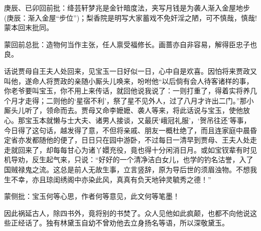 
\begin{parag}

    \begin{note}庚辰、已卯回前批：绛芸轩梦兆是金针暗度法，夹写月钱是为袭人渐入金屋地步(庚辰：渐入金屋“步位”)；梨香院是明写大家蓄戏不免奸淫之陋，可不慎哉，慎哉!蒙本回末批同。\end{note}
\end{parag}


\begin{parag}


    \begin{note}蒙回前总批：造物何当作主张，任人禀受福修长。画蔷亦自非容易，解得臣忠子也良。\end{note}
\end{parag}

\begin{parag}

    话说贾母自王夫人处回来，见宝玉一日好似一日，心中自是欢喜。因怕将来贾政又叫他，遂命人将贾政的亲随小厮头儿唤来，吩咐他“以后倘有会人待客诸样的事，你老爷要叫宝玉，你不用上来传话，就回他说我说了：一则打重了，得着实将养几个月才走得；二则他的‘星宿不利’，祭了星不见外人，过了八月才许出二门。”那小厮头儿听了，领命而去。贾母又命李嬷嬷、袭人等来，将此话说与宝玉，使他放心。那宝玉本就懒与士大夫、诸男人接谈，又最厌‘峨冠礼服’，‘贺吊往还’等事，今日得了这句话，越发得了意，不但将亲戚、朋友一概杜绝了，而且连家庭中晨昏定省亦发都随他的便了，日日只在园中游卧，不过每日一清早到贾母、王夫人处走走就回来了，却每每甘心为诸丫嬛充役，竟也得十分闲消日月。或如宝钗辈有时见机导劝，反生起气来，只说：“好好的一个清净洁白女儿，也学的钓名沽誉，入了国贼禄鬼之流。这总是前人无故生事，立言竖辞，原为导后世的须眉浊物。不想我生不幸，亦且琼闺绣阁中亦染此风，真真有负天地钟灵毓秀之德！”\begin{note}蒙侧批：宝玉何等心思，作者何等意见，此文何等笔墨！\end{note}因此祸延古人，除四书外，竟将别的书焚了。众人见他如此疯颠，也都不向他说这些正经话了。独有林黛玉自幼不曾劝他去立身扬名等语，所以深敬黛玉。
\end{parag}


